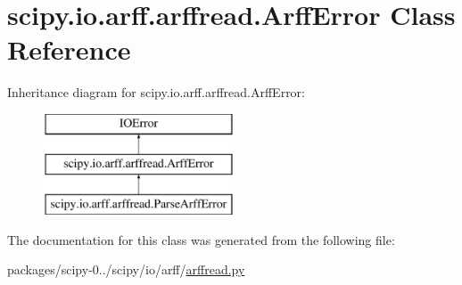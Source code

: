 \hypertarget{classscipy_1_1io_1_1arff_1_1arffread_1_1ArffError}{}\section{scipy.\+io.\+arff.\+arffread.\+Arff\+Error Class Reference}
\label{classscipy_1_1io_1_1arff_1_1arffread_1_1ArffError}
Inheritance diagram for scipy.\+io.\+arff.\+arffread.\+Arff\+Error\+:\begin{figure}[H]
\begin{center}
\leavevmode
\includegraphics[height=3.000000cm]{classscipy_1_1io_1_1arff_1_1arffread_1_1ArffError}
\end{center}
\end{figure}


The documentation for this class was generated from the following file\+:\begin{DoxyCompactItemize}
\item 
packages/scipy-\/0../scipy/io/arff/\hyperlink{arffread_8py}{arffread.\+py}\end{DoxyCompactItemize}
